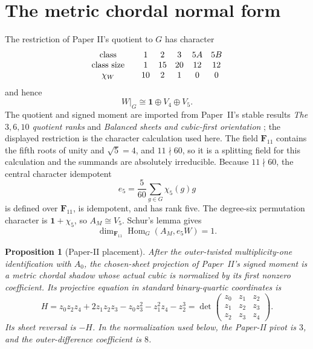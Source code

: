 \documentclass[11pt]{article}
\newtheorem{proposition}[theorem]{Proposition}
\theoremstyle{definition}
\theoremstyle{remark}
\newcommand{\F}{\mathbf F}
\begin{document}
\section{The metric chordal normal form}
\label{sec:placement}

The restriction of Paper II's quotient to \(G\) has character
\[
\begin{array}{c@{\qquad}ccccc}
\text{class}&1&2&3&5A&5B\\
\text{class size}&1&15&20&12&12\\
\chi_W&10&2&1&0&0
\end{array}
\]
and hence
\[
 W|_G\cong\mathbf1\oplus V_4\oplus V_5.
\]
The quotient and signed moment are imported from Paper~II's stable results
\emph{The \(3,6,10\) quotient ranks} and
\emph{Balanced sheets and cubic-first orientation}
\cite{RuddFactorization2026}; the displayed restriction is the character
calculation used here.  The field \(\F_{11}\) contains the fifth roots of
unity and \(\sqrt5=4\), and \(11\nmid60\), so it is a splitting field for
this calculation and the summands are absolutely irreducible.
Because \(11\nmid60\), the central character idempotent
\[
 e_5=\frac5{60}\sum_{g\in G}\chi_5(g)g
\]
is defined over \(\F_{11}\), is idempotent, and has rank five.  The
degree-six permutation character is \(\mathbf1+\chi_5\), so \(A_M\cong V_5\).
Schur's lemma gives
\[
 \dim_{\F_{11}}\operatorname{Hom}_G(A_M,e_5W)=1.
\]

\begin{proposition}[Paper-II placement]
\label{prop:paper-ii-placement}
After the outer-twisted multiplicity-one identification with \(A_0\), the
chosen-sheet projection of Paper~II's signed moment is a metric chordal
shadow whose actual cubic is normalized by its first nonzero coefficient.
Its projective equation in standard binary-quartic
coordinates is
\[
 H=z_0z_2z_4+2z_1z_2z_3-z_0z_3^2-z_1^2z_4-z_2^3
   =\det\!\begin{pmatrix}
       z_0&z_1&z_2\\ z_1&z_2&z_3\\ z_2&z_3&z_4
     \end{pmatrix}.
\]
Its sheet reversal is \(-H\).  In the normalization used below, the
Paper-II pivot is \(3\), and the outer-difference coefficient is \(8\).
\end{proposition}
\end{document}

